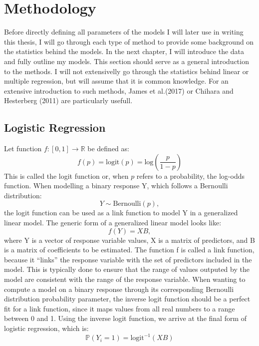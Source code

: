 \documentclass[12pt,twoside]{reedthesis}
\begin{document}
  \section{Methodology}\label{methodology}
  
  Before directly defining all parameters of the models I will later use
  in writing this thesis, I will go through each type of method to provide
  some background on the statistics behind the models. In the next
  chapter, I will introduce the data and fully outline my models. This
  section should serve as a general introduction to the methods. I will
  not extensivelly go through the statistics behind linear or multiple
  regression, but will assume that it is common knowledge. For an
  extensive introduction to such methods, James et al.(2017) or Chihara
  and Hesterberg (2011) are particularly usefull.
  
  \subsection{Logistic Regression}\label{logistic-regression}
  
  Let function \(f : [0, 1] \to \mathbb{R}\) be defined as:
  \[f(p) = \text{logit}(p) = \text{log}\left( \frac{p}{1-p} \right)\] This
  is called the logit function or, when \(p\) refers to a probability, the
  log-odds function. When modelling a binary response Y, which follows a
  Bernoulli distribution: \[Y \sim \text{Bernoulli}(p),\] the logit
  function can be used as a link function to model Y in a generalized
  linear model. The generic form of a generalized linear model looks
  like:\\
  \[f(Y) = XB,\] where Y is a vector of response variable values, X is a
  matrix of predictors, and B is a matrix of coefficients to be estimated.
  The function f is called a link function, because it ``links'' the
  response variable with the set of predictors included in the model. This
  is typically done to ensure that the range of values outputed by the
  model are consistent with the range of the response variable. When
  wanting to compute a model on a binary response through its
  corresponding Bernoulli distribution probability parameter, the inverse
  logit function should be a perfect fit for a link function, since it
  maps values from all real numbers to a range between 0 and 1. Using the
  inverse logit function, we arrive at the final form of logistic
  regression, which is:\\
  \[\mathbb{P} (Y_i = 1) = \text{logit}^{-1} (XB)\]
  
\end{document}

